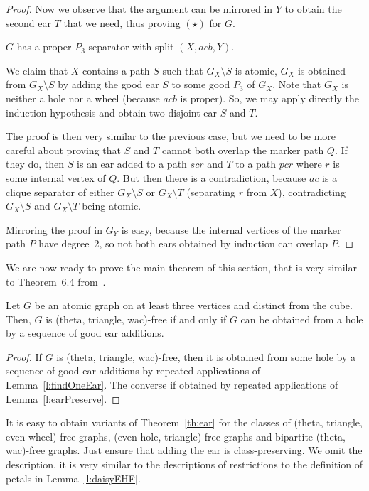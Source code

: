 \documentclass[11pt]{article}
\newcommand{\sm}{\setminus}
\begin{document}
\begin{proof}
  Now we observe that the argument can be mirrored in $Y$ to obtain the second ear $T$ that we need, thus proving $(\star)$ for $G$.  
  
  \medskip
  
   $G$ has a proper $P_3$-separator with split $(X, acb, Y)$.

  We claim that $X$ contains a path $S$ such that $G_X \sm S$ is atomic, $G_X$ is obtained from $G_X \sm S$ by adding the good ear $S$ to some good $P_3$ of $G_X$. Note that $G_X$ is neither a hole nor a wheel (because $acb$ is proper). 
  So, we may apply directly the induction hypothesis and obtain two disjoint ear $S$ and $T$. 

  The proof is then very similar to the previous case, but we need to be more careful about proving that $S$ and $T$ cannot both overlap the marker path $Q$. If they do, then $S$ is an ear added to a path $scr$ and $T$ to a path $pcr$ where $r$ is some internal vertex of $Q$.  But then there is a contradiction, because $ac$ is a clique separator of either $G_X \sm S$ or $G_X \sm T$ (separating $r$ from $X$), contradicting $G_X \sm S$ and $G_X \sm T$ being atomic.
  
  Mirroring the proof in $G_Y$ is easy, because the internal vertices of the marker path $P$ have degree~2, so not both ears obtained by induction can overlap $P$.  
\end{proof}

We are now ready to prove the main theorem of this section, that is very similar to Theorem~6.4 from~\cite{DBLP:journals/jgt/ConfortiCKV00}. 


\begin{theo}
  \label{th:ear}
 Let $G$ be an atomic graph on at least three vertices and distinct from the cube. Then, $G$ is (theta, triangle, wac)-free if and only if $G$ can be obtained from a hole by a sequence of good ear additions.   
\end{theo}

\begin{proof}
  If $G$ is (theta, triangle, wac)-free, then it is obtained from some hole by a sequence of good ear additions by repeated applications of  Lemma~\ref{l:findOneEar}. The converse if obtained by repeated applications of Lemma~\ref{l:earPreserve}.
\end{proof}

It is easy to obtain variants of Theorem~\ref{th:ear} for the classes of (theta, triangle, even wheel)-free graphs, (even hole, triangle)-free graphs and bipartite (theta, wac)-free graphs.  Just ensure that adding the ear is class-preserving.  We omit the description, it is very similar to the descriptions of restrictions to the definition of petals in Lemma~\ref{l:daisyEHF}.
\end{document}
